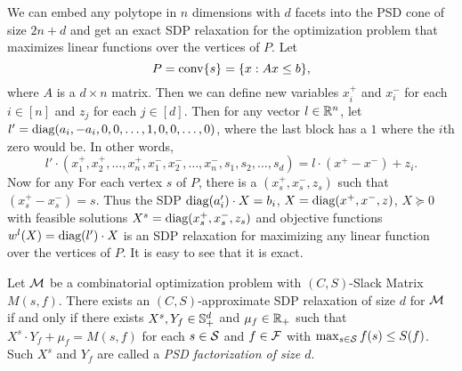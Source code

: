 \begin{example}
We can embed any polytope in $n$ dimensions with $d$ facets into the PSD cone of size $2n+d$ and get an exact SDP relaxation for the optimization problem that maximizes linear functions over the vertices of $P$. Let
\[P = \operatorname{conv}\{s\} = \{x: Ax \leq b\},\]
where $A$ is a $d \times n$ matrix. Then we can define new variables $x_i^+$ and $x_i^-$ for each $i \in [n]$ and $z_j$ for each $j \in [d]$. Then for any vector $l \in \mathbb R^n$, let $l' = \text{diag}(a_i,-a_i,0,0,\dots,1,0,0,\dots,0)$, where the last block has a $1$ where the $i$th zero would be. In other words, 
\[l' \cdot (x_1^+,x_2^+,\dots,x_n^+,x_1^-,x_2^-,\dots,x_n^-,s_1,s_2,\dots,s_d) = l \cdot (x^+ - x^-) + z_i.\]
Now for any For each vertex $s$ of $P$, there is a $(x_s^+,x_s^-,z_s)$ such that $(x_s^+ - x_s^-) = s$. Thus the SDP $\text{diag}(a_i') \cdot X = b_i$, $X = \text{diag}(x^+,x^-,z)$, $X \succeq 0$ with feasible solutions $X^s = \text{diag}(x_s^+,x_s^-,z_s)$ and objective functions $w^l(X) = \text{diag}(l') \cdot X$ is an SDP relaxation for maximizing any linear function over the vertices of $P$. It is easy to see that it is exact.

\end{example}
\begin{theorem}
Let $\mathcal M$ be a combinatorial optimization problem with $(C,S)$-Slack Matrix $M(s,f)$. There exists an $(C,S)$-approximate SDP relaxation of size $d$ for $\mathcal M$ if and only if there exists $X^s,Y_f \in \mathbb{S}^{d}_+$ and $\mu_f \in \mathbb R_+$ such that $X^s \cdot Y_f + \mu_f = M(s,f)$ for each $s \in \mathcal S $ and $f \in \mathcal F$ with $\max_{s \in \mathcal S} f(s) \leq S(f)$. Such $X^s$ and $Y_f$ are called a \emph{PSD factorization of size $d$}.
\end{theorem}
